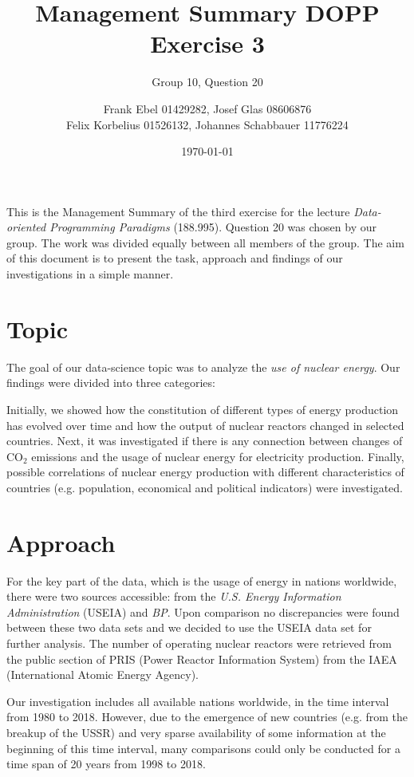 \documentclass[a4paper,10pt,twocolumn]{scrartcl}
\author{Frank Ebel 01429282, Josef Glas 08606876\\Felix Korbelius 01526132, Johannes Schabbauer 11776224}
\title{\vspace*{-1cm}Management Summary DOPP Exercise 3}
\subtitle{Group 10, Question 20}
\date{\today \vspace*{-0.8cm}}
\begin{document}
\sffamily
\maketitle

This is the Management Summary of the third exercise for the lecture \emph{Data-oriented Programming Paradigms} (188.995).  Question 20 was chosen by our group. The work was divided equally between all members of the group. The aim of this document is to present the task, approach and findings of our investigations in a simple manner.

\section{Topic}

The goal of our data-science topic was to analyze the \emph{use of nuclear energy}. Our findings were divided into three categories:

Initially, we showed how the constitution of different types of energy production has evolved over time and how the output of nuclear reactors changed in selected countries. Next, it was investigated if there is any connection between changes of CO$_2$ emissions and the usage of nuclear energy for electricity production. Finally, possible correlations of nuclear energy production with different characteristics of countries (e.g. population, economical and political indicators) were investigated.

\section{Approach}

For the key part of the data, which is the usage of energy in nations worldwide, there were two sources accessible: from the \emph{U.S. Energy Information Administration} (USEIA) and \emph{BP}. Upon comparison no discrepancies were found between these two data sets and we decided to use the USEIA data set for further analysis. 
The number of operating nuclear reactors were retrieved from the public section of PRIS (Power Reactor Information System) from the IAEA (International Atomic Energy Agency).

Our investigation includes all available nations worldwide, in the time interval from 1980 to 2018. However, due to the emergence of new countries (e.g. from the breakup of the USSR) and very sparse availability of some information at the beginning of this time interval, many comparisons could only be conducted for a time span of 20 years from 1998 to 2018. 
\end{document}
